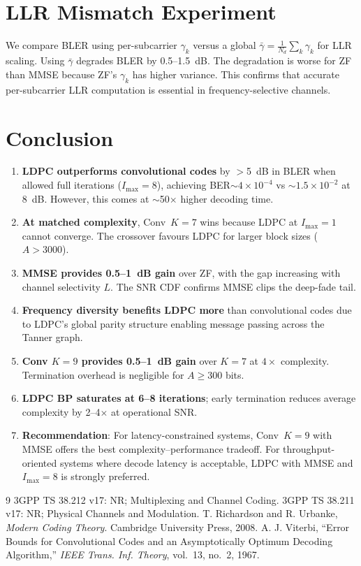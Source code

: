 \documentclass[12pt, a4paper]{article}
\begin{document}
\section{LLR Mismatch Experiment}
We compare BLER using per-subcarrier $\gamma_k$ versus a global $\bar{\gamma} = \frac{1}{N_d}\sum_k \gamma_k$ for LLR scaling. Using $\bar{\gamma}$ degrades BLER by 0.5--1.5~dB. The degradation is worse for ZF than MMSE because ZF's $\gamma_k$ has higher variance. This confirms that accurate per-subcarrier LLR computation is essential in frequency-selective channels.

\section{Conclusion}
\begin{enumerate}[nosep]
\item \textbf{LDPC outperforms convolutional codes} by $>$5~dB in BLER when allowed full iterations ($I_{\max}=8$), achieving BER$\sim 4\times10^{-4}$ vs $\sim 1.5\times10^{-2}$ at 8~dB. However, this comes at $\sim$50$\times$ higher decoding time.
\item \textbf{At matched complexity}, Conv~$K\!=\!7$ wins because LDPC at $I_{\max}=1$ cannot converge. The crossover favours LDPC for larger block sizes ($A>3000$).
\item \textbf{MMSE provides 0.5--1~dB gain} over ZF, with the gap increasing with channel selectivity $L$. The SNR CDF confirms MMSE clips the deep-fade tail.
\item \textbf{Frequency diversity benefits LDPC more} than convolutional codes due to LDPC's global parity structure enabling message passing across the Tanner graph.
\item \textbf{Conv $K\!=\!9$ provides 0.5--1~dB gain} over $K\!=\!7$ at $4\times$ complexity. Termination overhead is negligible for $A\geq 300$ bits.
\item \textbf{LDPC BP saturates at 6--8 iterations}; early termination reduces average complexity by 2--4$\times$ at operational SNR.
\item \textbf{Recommendation}: For latency-constrained systems, Conv~$K\!=\!9$ with MMSE offers the best complexity--performance tradeoff. For throughput-oriented systems where decode latency is acceptable, LDPC with MMSE and $I_{\max}=8$ is strongly preferred.
\end{enumerate}

\begin{thebibliography}{9}
 3GPP TS 38.212 v17: NR; Multiplexing and Channel Coding.
 3GPP TS 38.211 v17: NR; Physical Channels and Modulation.
 T. Richardson and R. Urbanke, \textit{Modern Coding Theory}. Cambridge University Press, 2008.
 A. J. Viterbi, ``Error Bounds for Convolutional Codes and an Asymptotically Optimum Decoding Algorithm,'' \textit{IEEE Trans. Inf. Theory}, vol.~13, no.~2, 1967.
\end{thebibliography}
\end{document}
